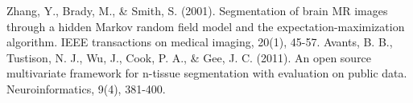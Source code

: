 \documentclass[conference]{IEEEtran}
\begin{document}
\begin{thebibliography}{1}
Zhang, Y., Brady, M., \& Smith, S. (2001). Segmentation of brain MR images through a hidden Markov random field model and the expectation-maximization algorithm. IEEE transactions on medical imaging, 20(1), 45-57.
Avants, B. B., Tustison, N. J., Wu, J., Cook, P. A., \& Gee, J. C. (2011). An open source multivariate framework for n-tissue segmentation with evaluation on public data. Neuroinformatics, 9(4), 381-400.


\end{thebibliography}




\end{document}
